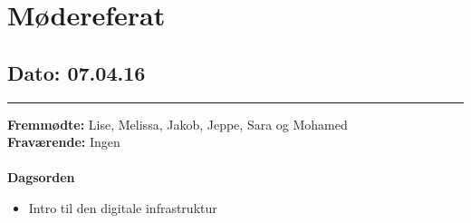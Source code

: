 \chapter{Mødereferat}

\section{Dato: 07.04.16}
\hrule
\textbf{Fremmødte:} Lise, Melissa, Jakob, Jeppe, Sara og Mohamed \\

\textbf{Fraværende:} Ingen
\\
\\
\textbf{Dagsorden}
\begin{itemize}
\item Intro til den digitale infrastruktur
\end{itemize}

